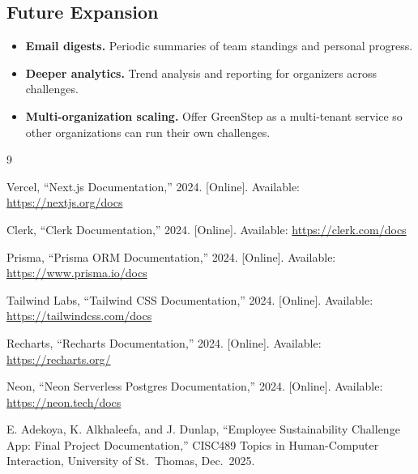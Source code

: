 \documentclass[12pt]{article}
\begin{document}
\subsection{Future Expansion}

\begin{itemize}
    \item \textbf{Email digests.} Periodic summaries of team standings and
    personal progress.
    \item \textbf{Deeper analytics.} Trend analysis and reporting for
    organizers across challenges.
    \item \textbf{Multi-organization scaling.} Offer GreenStep as a
    multi-tenant service so other organizations can run their own challenges.
\end{itemize}

\begin{thebibliography}{9}

Vercel, ``Next.js Documentation,'' 2024. [Online]. Available:
\url{https://nextjs.org/docs}

Clerk, ``Clerk Documentation,'' 2024. [Online]. Available:
\url{https://clerk.com/docs}

Prisma, ``Prisma ORM Documentation,'' 2024. [Online]. Available:
\url{https://www.prisma.io/docs}

Tailwind Labs, ``Tailwind CSS Documentation,'' 2024. [Online]. Available:
\url{https://tailwindcss.com/docs}

Recharts, ``Recharts Documentation,'' 2024. [Online]. Available:
\url{https://recharts.org/}

Neon, ``Neon Serverless Postgres Documentation,'' 2024. [Online]. Available:
\url{https://neon.tech/docs}

E. Adekoya, K. Alkhaleefa, and J. Dunlap, ``Employee Sustainability Challenge
App: Final Project Documentation,'' CISC489 Topics in Human-Computer
Interaction, University of St.\ Thomas, Dec.\ 2025.

\end{thebibliography}
\end{document}
